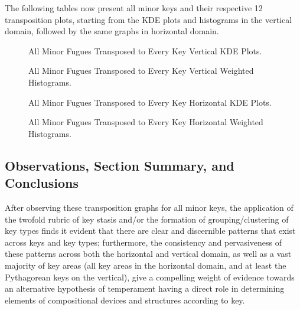 The following tables now present all minor keys and their respective 12
transposition plots, starting from the KDE plots and histograms in the
vertical domain, followed by the same graphs in horizontal domain.




\begin{figure}[H]
    \begin{center}
    \caption{All Minor Fugues Transposed to Every Key Vertical KDE Plots. }
    \end{center}
\end{figure}
    



\begin{figure}[H]
    \begin{center}
    \caption{All Minor Fugues Transposed to Every Key Vertical Weighted Histograms. }
    \end{center}
\end{figure}
    



\begin{figure}[H]
    \begin{center}
    \caption{All Minor Fugues Transposed to Every Key Horizontal KDE Plots. }
    \end{center}
\end{figure}
    



\begin{figure}[H]
    \begin{center}
    \caption{All Minor Fugues Transposed to Every Key Horizontal Weighted Histograms. }
    \end{center}
\end{figure}
    
    \subsection{Observations, Section Summary, and
Conclusions}\label{observations-section-summary-and-conclusions}

After observing these transposition graphs for all minor keys, the
application of the twofold rubric of key stasis and/or the formation of
grouping/clustering of key types finds it evident that there are clear
and discernible patterns that exist across keys and key types;
furthermore, the consistency and pervasiveness of these patterns across
both the horizontal and vertical domain, as well as a vast majority of
key areas (all key areas in the horizontal domain, and at least the
Pythagorean keys on the vertical), give a compelling weight of evidence
towards an alternative hypothesis of temperament having a direct role in
determining elements of compositional devices and structures according
to key.

